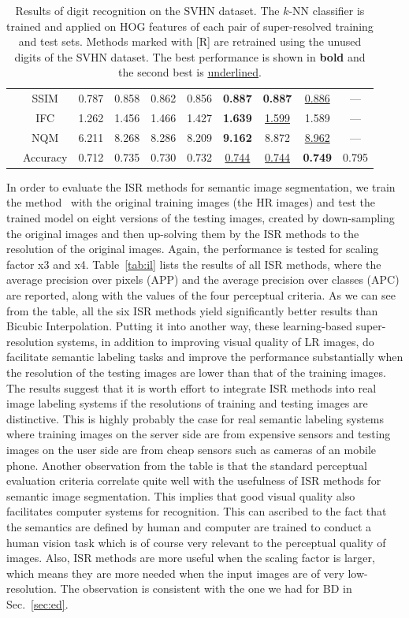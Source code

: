 \begin{table} [tb]
{\begin{tabular}{|l|c|ccccccc|c|}
  & SSIM & 0.787 & 0.858 & 0.862 & 0.856 & \textbf{0.887} & \textbf{0.887} & \underline{0.886} & --- \\
  & IFC & 1.262 & 1.456 & 1.466 & 1.427 & \textbf{1.639} & \underline{1.599} & 1.589 & --- \\
  & NQM & 6.211 & 8.268 & 8.286 & 8.209 & \textbf{9.162} & 8.872 & \underline{8.962} & --- \\   \hline
  & Accuracy & 0.712 & 0.735 & 0.730 & 0.732 & \underline{0.744} & \underline{0.744} & \textbf{0.749} & 0.795 \\
  \hline
\end{tabular}
}
\caption{Results of digit recognition on the SVHN dataset. 
The $k$-NN classifier is trained and applied on HOG features of each pair of super-resolved 
training and test sets. Methods marked with [R] are retrained using the unused digits of 
the SVHN dataset. The best performance is shown in \textbf{bold} and the second best is \underline{underlined}.}
\label{tab:dr}
\end{table}

In order to evaluate the ISR methods for semantic image segmentation, we train the
method~\cite{superpixel:eccv14} with the original training images (\eg the HR images) and
test the trained model on eight versions of the testing images,
created by down-sampling the original images and then up-solving them
by the ISR methods to the resolution of the original images. Again,
the performance is tested for scaling factor x3 and x4.
Table~\ref{tab:il} lists the results of all ISR methods, where the
average precision over pixels (APP) and the average precision over
classes (APC) are reported, along with the values of the four
perceptual criteria. As we can see from the table, all the six ISR
methods yield significantly better results than Bicubic
Interpolation. Putting it into another way, these learning-based
super-resolution systems, in addition to improving visual quality of
LR images, do facilitate semantic labeling tasks and improve the
performance substantially when the resolution of the testing images
are lower than that of the training images. The results suggest that
it is worth effort to integrate ISR methods into real image
labeling systems if the resolutions of training and testing images are
distinctive. This is highly probably the case for real semantic labeling
systems where training images on the server side are from expensive
sensors and testing images on the user side are from cheap sensors
such as cameras of an mobile phone. Another observation from the table
is that the standard perceptual evaluation criteria  correlate
quite well with the usefulness of ISR methods for semantic image segmentation. This
implies that good visual quality also facilitates computer systems for
recognition. This can ascribed to the fact that the semantics are
defined by human and computer are trained to conduct a human vision
task which is of course very relevant to the perceptual quality of
images. Also, ISR methods are more useful when the scaling factor is
larger, which means they are more needed when the input images are
of very low-resolution.  The observation is consistent with the one we had for
BD in Sec.~\ref{sec:ed}.



